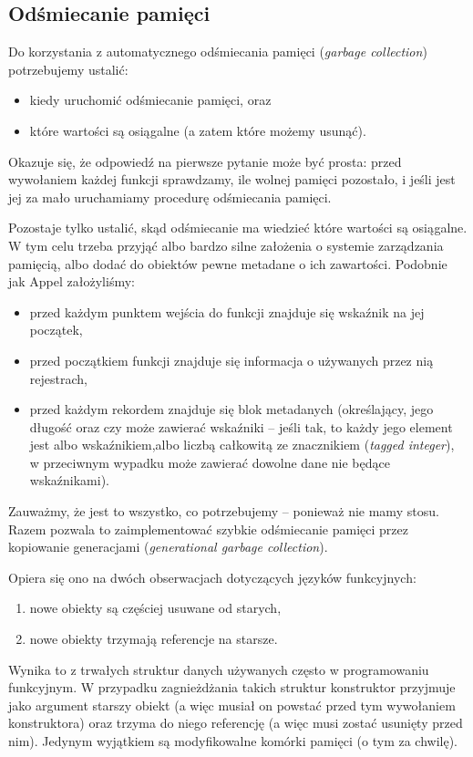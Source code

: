 \documentclass[11pt]{scrartcl}
\begin{document}
\subsection{Odśmiecanie pamięci}
Do korzystania z automatycznego odśmiecania pamięci (\textit{garbage collection})
potrzebujemy ustalić:
\begin{itemize}
\item  kiedy uruchomić odśmiecanie pamięci, oraz
\item które wartości są osiągalne (a zatem które możemy usunąć).
\end{itemize}
Okazuje się, że odpowiedź na pierwsze pytanie może być prosta: przed wywołaniem
każdej funkcji sprawdzamy, ile wolnej pamięci pozostało, i jeśli jest jej za
mało uruchamiamy procedurę odśmiecania pamięci.

Pozostaje tylko ustalić, skąd odśmiecanie ma wiedzieć które wartości są
osiągalne. W tym celu trzeba przyjąć albo bardzo silne założenia o systemie
zarządzania pamięcią, albo dodać do obiektów pewne metadane o ich zawartości.
Podobnie jak Appel \cite[Chapter 16.4: Runtime data formats]{Appel} założyliśmy:
\begin{itemize}
\item przed każdym punktem wejścia do funkcji znajduje się wskaźnik na jej
  początek,
\item przed początkiem funkcji znajduje się informacja o używanych przez nią
  rejestrach,
\item przed każdym rekordem znajduje się blok metadanych (określający, jego
  długość oraz czy może zawierać wskaźniki -- jeśli tak, to każdy jego element
  jest albo wskaźnikiem,albo liczbą całkowitą ze znacznikiem (\textit{tagged integer}), w przeciwnym wypadku
  może zawierać dowolne dane nie będące wskaźnikami).
\end{itemize}

Zauważmy, że jest to wszystko, co potrzebujemy -- ponieważ nie mamy stosu. Razem
pozwala to zaimplementować szybkie odśmiecanie pamięci przez kopiowanie
generacjami (\textit{generational garbage collection}).

Opiera się ono na dwóch obserwacjach dotyczących języków funkcyjnych:
\begin{enumerate}
\item nowe obiekty są częściej usuwane od starych,
\item nowe obiekty trzymają referencje na starsze.
\end{enumerate}

Wynika to z trwałych struktur danych używanych często w programowaniu
funkcyjnym. W przypadku zagnieżdżania takich struktur konstruktor przyjmuje jako
argument starszy obiekt (a więc musiał on powstać przed tym wywołaniem
konstruktora) oraz trzyma do niego referencję (a więc musi zostać usunięty przed
nim). Jedynym wyjątkiem są modyfikowalne komórki pamięci (o tym za chwilę).
\end{document}

